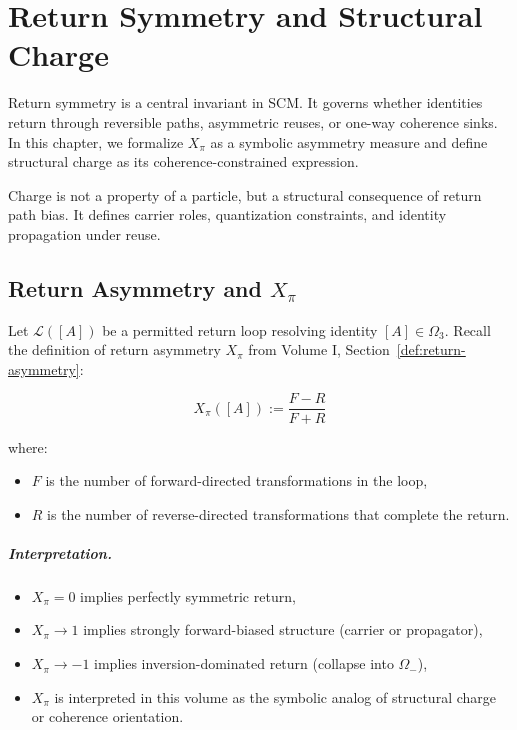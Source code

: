 \chapter{Return Symmetry and Structural Charge} \label{chapter-charge}

Return symmetry is a central invariant in SCM. It governs whether identities return through reversible paths, asymmetric reuses, or one-way coherence sinks. In this chapter, we formalize $X_\pi$ as a symbolic asymmetry measure and define structural charge as its coherence-constrained expression.

Charge is not a property of a particle, but a structural consequence of return path bias. It defines carrier roles, quantization constraints, and identity propagation under reuse.

\section{Return Asymmetry and $X_\pi$} \label{sec:return-asymmetry}

Let $\mathcal{L}([A])$ be a permitted return loop resolving identity $[A] \in \Omega_3$. Recall the definition of return asymmetry $X_\pi$ from Volume I, Section~\ref{def:return-asymmetry}:

\begin{equation}
X_\pi([A]) := \frac{F - R}{F + R}
\end{equation}

where:
\begin{itemize}
    \item $F$ is the number of forward-directed transformations in the loop,
    \item $R$ is the number of reverse-directed transformations that complete the return.
\end{itemize}

\paragraph{Interpretation.}
\begin{itemize}
    \item $X_\pi = 0$ implies perfectly symmetric return,
    \item $X_\pi \to 1$ implies strongly forward-biased structure (carrier or propagator),
    \item $X_\pi \to -1$ implies inversion-dominated return (collapse into $\Omega_-$),
    \item $X_\pi$ is interpreted in this volume as the symbolic analog of structural charge or coherence orientation.
\end{itemize}

